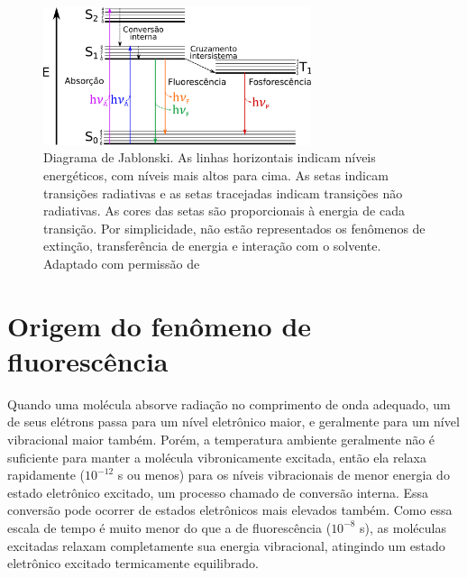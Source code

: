 		\begin{figure}[h]
			\centering
			\includegraphics[width=0.7\textwidth]{imagens/fluor/diagrama_jablonski}
			\caption{Diagrama de Jablonski. As linhas horizontais indicam níveis energéticos, com níveis mais altos para cima. As setas indicam transições radiativas e as setas tracejadas indicam transições não radiativas. As cores das setas são proporcionais à energia de cada transição. Por simplicidade, não estão representados os fenômenos de extinção, transferência de energia e interação com o solvente. Adaptado com permissão de \citeauthor{Lakowicz2006}}
			\label{fig:diagrama_jablonski} 
		\end{figure}  
		
		\section{Origem do fenômeno de fluorescência} 
		
		Quando uma molécula absorve radiação no comprimento de onda adequado, um de seus elétrons passa para um nível eletrônico maior, e geralmente para um nível vibracional maior também. Porém, a temperatura ambiente geralmente não é suficiente para manter a molécula vibronicamente excitada, então ela relaxa rapidamente (\(10^{-12}\) s ou menos) para os níveis vibracionais de menor energia do estado eletrônico excitado, um processo chamado de conversão interna. Essa conversão pode ocorrer de estados eletrônicos mais elevados também. Como essa escala de tempo é muito menor do que a de fluorescência (\(10^{-8}\) s), as moléculas excitadas relaxam completamente sua energia vibracional, atingindo um estado eletrônico excitado termicamente equilibrado.\cite{Lakowicz2006}
		
